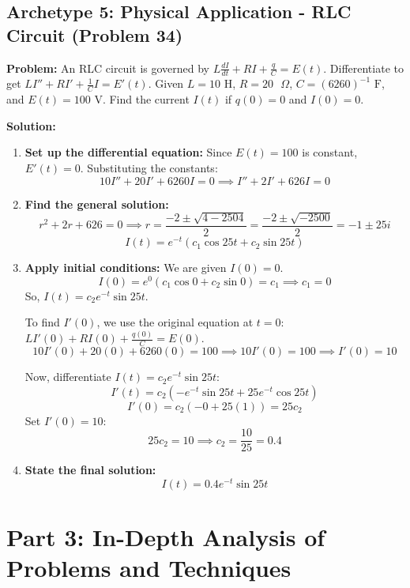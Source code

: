 \documentclass[11pt]{article}
\begin{document}
\subsection{Archetype 5: Physical Application - RLC Circuit (Problem 34)}
\textbf{Problem:} An RLC circuit is governed by $L \frac{dI}{dt} + RI + \frac{q}{C} = E(t)$. Differentiate to get $L I'' + R I' + \frac{1}{C} I = E'(t)$. Given $L = 10\text{ H}$, $R = 20\text{ }\Omega$, $C = (6260)^{-1}\text{ F}$, and $E(t) = 100\text{ V}$. Find the current $I(t)$ if $q(0) = 0$ and $I(0) = 0$.

\textbf{Solution:}
\begin{enumerate}
    \item \textbf{Set up the differential equation:}
    Since $E(t) = 100$ is constant, $E'(t) = 0$. Substituting the constants:
    \[ 10 I'' + 20 I' + 6260 I = 0 \implies I'' + 2I' + 626I = 0 \]
    \item \textbf{Find the general solution:}
    \[ r^2 + 2r + 626 = 0 \implies r = \frac{-2 \pm \sqrt{4 - 2504}}{2} = \frac{-2 \pm \sqrt{-2500}}{2} = -1 \pm 25i \]
    \[ I(t) = e^{-t}(c_1 \cos 25t + c_2 \sin 25t) \]
    \item \textbf{Apply initial conditions:}
    We are given $I(0) = 0$.
    \[ I(0) = e^0(c_1 \cos 0 + c_2 \sin 0) = c_1 \implies c_1 = 0 \]
    So, $I(t) = c_2 e^{-t} \sin 25t$.
    
    To find $I'(0)$, we use the original equation at $t=0$: $L I'(0) + R I(0) + \frac{q(0)}{C} = E(0)$.
    \[ 10 I'(0) + 20(0) + 6260(0) = 100 \implies 10 I'(0) = 100 \implies I'(0) = 10 \]
    
    Now, differentiate $I(t) = c_2 e^{-t} \sin 25t$:
    \[ I'(t) = c_2 \left( -e^{-t} \sin 25t + 25e^{-t} \cos 25t \right) \]
    \[ I'(0) = c_2 ( -0 + 25(1) ) = 25c_2 \]
    Set $I'(0) = 10$:
    \[ 25c_2 = 10 \implies c_2 = \frac{10}{25} = 0.4 \]
    \item \textbf{State the final solution:}
    \[ I(t) = 0.4 e^{-t} \sin 25t \]
\end{enumerate}

\newpage
\section{Part 3: In-Depth Analysis of Problems and Techniques}
\end{document}
